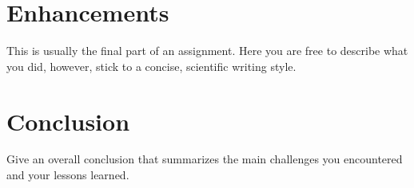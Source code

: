 \documentclass{report}
\begin{document}
\section{Enhancements}

This is usually the final part of an assignment.
Here you are free to describe what you did, however, stick to a concise, scientific writing style.

\section{Conclusion}

Give an overall conclusion that summarizes the main challenges you encountered and your lessons learned.



\end{document}
